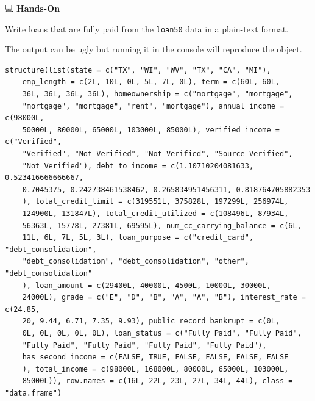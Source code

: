 \documentclass[
  letterpaper,
  DIV=11,
  numbers=noendperiod]{scrreprt}
\newenvironment{Shaded}{\begin{snugshade}}{\end{snugshade}}
\newcommand{\FunctionTok}[1]{\textcolor[rgb]{0.28,0.35,0.67}{#1}}
\newcommand{\NormalTok}[1]{\textcolor[rgb]{0.00,0.23,0.31}{#1}}
\newcommand{\OtherTok}[1]{\textcolor[rgb]{0.00,0.23,0.31}{#1}}
\newcommand{\SpecialCharTok}[1]{\textcolor[rgb]{0.37,0.37,0.37}{#1}}
\newcommand{\StringTok}[1]{\textcolor[rgb]{0.13,0.47,0.30}{#1}}
\begin{document}
💻 \textbf{Hands-On}

Write loans that are fully paid from the \texttt{loan50} data in a
plain-text format.

\begin{tcolorbox}[enhanced jigsaw, colbacktitle=quarto-callout-tip-color!10!white, opacitybacktitle=0.6, breakable, left=2mm, leftrule=.75mm, toprule=.15mm, toptitle=1mm, bottomtitle=1mm, colframe=quarto-callout-tip-color-frame, opacityback=0, coltitle=black, arc=.35mm, titlerule=0mm, colback=white, bottomrule=.15mm, title=\textcolor{quarto-callout-tip-color}{\faLightbulb}\hspace{0.5em}{Answer}, rightrule=.15mm]

The output can be ugly but running it in the console will reproduce the
object.

\begin{Shaded}
\end{Shaded}

\begin{verbatim}
structure(list(state = c("TX", "WI", "WV", "TX", "CA", "MI"), 
    emp_length = c(2L, 10L, 0L, 5L, 7L, 0L), term = c(60L, 60L, 
    36L, 36L, 36L, 36L), homeownership = c("mortgage", "mortgage", 
    "mortgage", "mortgage", "rent", "mortgage"), annual_income = c(98000L, 
    50000L, 80000L, 65000L, 103000L, 85000L), verified_income = c("Verified", 
    "Verified", "Not Verified", "Not Verified", "Source Verified", 
    "Not Verified"), debt_to_income = c(1.10710204081633, 0.523416666666667, 
    0.7045375, 0.242738461538462, 0.265834951456311, 0.818764705882353
    ), total_credit_limit = c(319551L, 375828L, 197299L, 256974L, 
    124900L, 131847L), total_credit_utilized = c(108496L, 87934L, 
    56363L, 15778L, 27381L, 69595L), num_cc_carrying_balance = c(6L, 
    11L, 6L, 7L, 5L, 3L), loan_purpose = c("credit_card", "debt_consolidation", 
    "debt_consolidation", "debt_consolidation", "other", "debt_consolidation"
    ), loan_amount = c(29400L, 40000L, 4500L, 10000L, 30000L, 
    24000L), grade = c("E", "D", "B", "A", "A", "B"), interest_rate = c(24.85, 
    20, 9.44, 6.71, 7.35, 9.93), public_record_bankrupt = c(0L, 
    0L, 0L, 0L, 0L, 0L), loan_status = c("Fully Paid", "Fully Paid", 
    "Fully Paid", "Fully Paid", "Fully Paid", "Fully Paid"), 
    has_second_income = c(FALSE, TRUE, FALSE, FALSE, FALSE, FALSE
    ), total_income = c(98000L, 168000L, 80000L, 65000L, 103000L, 
    85000L)), row.names = c(16L, 22L, 23L, 27L, 34L, 44L), class = "data.frame")
\end{verbatim}

\end{tcolorbox}
\end{document}
